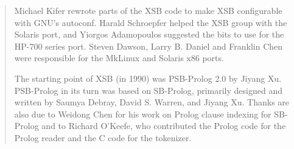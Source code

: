 \begin{quote}
Michael Kifer rewrote parts of the XSB code to make XSB configurable
with GNU's autoconf.  Harald Schroepfer helped the XSB group with the
Solaris port, and Yiorgos Adamopoulos suggested the bits to use for
the HP-700 series port.  Steven Dawson, Larry B. Daniel and Franklin
Chen were responsible for the MkLinux and Solaris x86 ports.

The starting point of XSB (in 1990) was PSB-Prolog 2.0 by Jiyang Xu.
PSB-Prolog in its turn was based on SB-Prolog, primarily designed and
written by Saumya Debray, David S. Warren, and Jiyang Xu.  Thanks are
also due to Weidong Chen for his work on Prolog clause indexing for
SB-Prolog and to Richard O'Keefe, who contributed the Prolog code for
the Prolog reader and the C code for the tokenizer.  

\end{quote}

